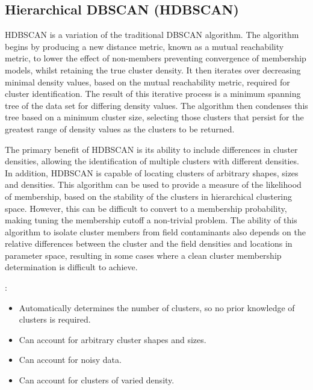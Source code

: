 \subsection{Hierarchical DBSCAN (HDBSCAN)}

HDBSCAN \citep{campello_density-based_2013} is a variation of the traditional DBSCAN algorithm. The algorithm begins by producing a new distance metric, known as a mutual reachability metric, to lower the effect of non-members preventing convergence of membership models, whilst retaining the true cluster density. It then iterates over decreasing minimal density values, based on the mutual reachability metric, required for cluster identification. The result of this iterative process is a minimum spanning tree of the data set for differing density values. The algorithm then condenses this tree based on a minimum cluster size, selecting those clusters that persist for the greatest range of density values as the clusters to be returned. 

The primary benefit of HDBSCAN is its ability to include differences in cluster densities, allowing the identification of multiple clusters with different densities. In addition, HDBSCAN is capable of locating clusters of arbitrary shapes, sizes and densities. This algorithm can be used to provide a measure of the likelihood of membership, based on the stability of the clusters in hierarchical clustering space. However, this can be difficult to convert to a membership probability, making tuning the membership cutoff a non-trivial problem. The ability of this algorithm to isolate cluster members from field contaminants also depends on the relative differences between the cluster and the field densities and locations in parameter space, resulting in some cases where a clean cluster membership determination is difficult to achieve.

\vspace{10pt}


: 
\begin{itemize}
    \item Automatically determines the number of clusters, so no prior knowledge of clusters is required.
    \item Can account for arbitrary cluster shapes and sizes.
    \item Can account for noisy data.
    \item Can account for clusters of varied density.
\end{itemize} 

